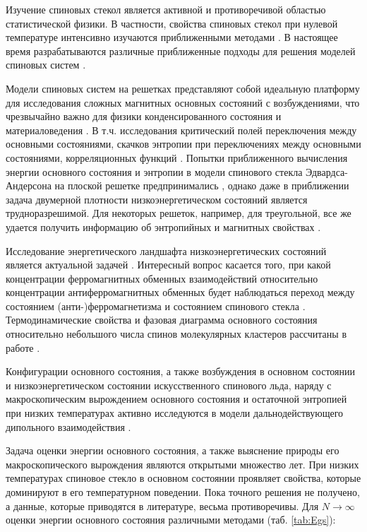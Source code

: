 \documentclass[utf8, babel, sor, jor, amsmath, amssymb, reprint]{elsarticle} %
\begin{document}
Изучение спиновых стекол является активной и противоречивой областью статистической физики. В частности, свойства спиновых стекол при нулевой температуре интенсивно изучаются приближенными методами \cite{perez2012ground}. В настоящее время разрабатываются различные приближенные подходы для решения моделей спиновых систем \cite{farias2024differentiable, rybin2022hybrid, makarova2023canonical}. 

Модели спиновых систем на решетках представляют собой идеальную платформу для исследования сложных магнитных основных состояний с возбуждениями, что чрезвычайно важно для физики конденсированного состояния и материаловедения \cite{lacroix2011introduction}. В т.ч. исследования критический полей переключения между основными состояниями, скачков энтропии при переключениях между основными состояниями, корреляционных функций \cite{ramirez2004effect, rosas2004random, andriushchenko2019large}. Попытки приближенного вычисления энергии основного состояния и энтропии в модели спинового стекла Эдвардса-Андерсона на плоской решетке предпринимались \cite{perez2012ground}, однако даже в приближении задача двумерной плотности низкоэнергетическом состояний является трудноразрешимой. Для некоторых решеток, например, для треугольной, все же удается получить информацию об энтропийных и магнитных свойствах \cite{jurvcivsinova2024classical}.

Исследование энергетического ландшафта низкоэнергетических состояний является актуальной задачей \cite{biswas2023energy}. Интересный вопрос касается того, при какой концентрации ферромагнитных обменных взаимодействий относительно концентрации антиферромагнитных обменных будет наблюдаться переход между состоянием (анти-)ферромагнетизма и состоянием спинового стекла \cite{zimmer2022role}. Термодинамические свойства и фазовая диаграмма основного состояния относительно небольшого числа спинов молекулярных кластеров рассчитаны в работе \cite{dias2023ground}.

Конфигурации основного состояния, а также возбуждения в основном состоянии и низкоэнергетическом состоянии искусственного спинового льда, наряду с макроскопическим вырождением основного состояния и остаточной энтропией  при низких температурах активно исследуются в модели дальнодействующего дипольного взаимодействия \cite{makarova2021low, singh2024micromagnetic}.

Задача оценки энергии основного состояния, а также выяснение природы его макроскопического вырождения являются открытыми множество лет. При низких температурах спиновое стекло в основном состоянии проявляет свойства, которые доминируют в его температурном поведении. Пока точного решения не получено, а данные, которые приводятся в литературе, весьма противоречивы. Для $N\rightarrow \infty$ оценки энергии основного состояния различными методами (таб. \ref{tab:Egs}):
\end{document}
